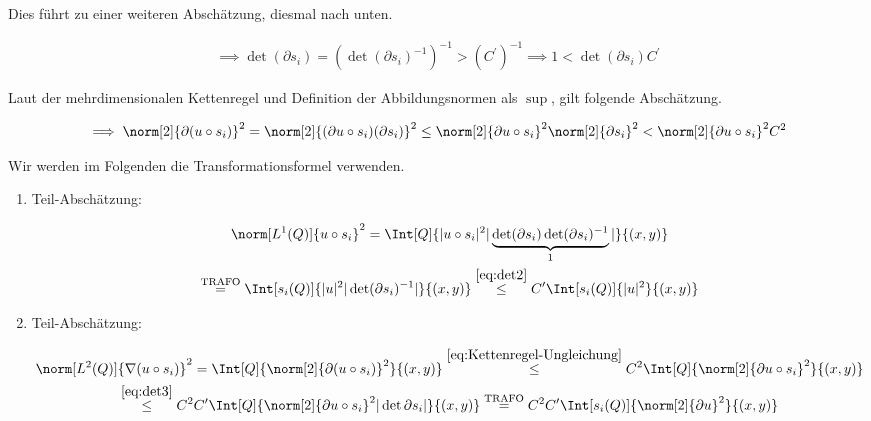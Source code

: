 \begin{solution}
\begin{enumerate}[label = \textbf{\alph*)}]
\begin{enumerate}[label = \arabic*.]
    Dies führt zu einer weiteren Abschätzung, diesmal nach unten.

    \begin{align}
      \label{eq:det3}
      \implies
      \det (\partial s_i)
      =
      (\det (\partial s_i)^{-1})^{-1}
      >
      (C^\prime)^{-1}
      \implies
      1
      <
      \det (\partial s_i)
      C^\prime
    \end{align}

    Laut der mehrdimensionalen Kettenregel und Definition der Abbildungsnormen als $\sup$, gilt folgende Abschätzung.

    \begin{align}
      \label{eq:Kettenregel-Ungleichung}
      \implies
      \norm[2]{\partial (u \circ s_i)}^2
      =
      \norm[2]{(\partial u \circ s_i)(\partial s_i)}^2
      \leq
      \norm[2]{\partial u \circ s_i}^2
      \norm[2]{\partial s_i}^2
      <
      \norm[2]{\partial u \circ s_i}^2
      C^2
    \end{align}

    Wir werden im Folgenden die Transformationsformel verwenden.


    \begin{enumerate}[label = \arabic*.]

      \item Teil-Abschätzung:

      \begin{multline}
        \label{eq:part1}
        \norm[L^1(Q)]{u \circ s_i}^2
        =
        \Int[Q]
        {
          |u \circ s_i|^2
          |
            \underbrace
            {
              \det (\partial s_i)
              \det (\partial s_i)^{-1}
            }_1
          |
        }{(x, y)} \\
        \stackrel
        {
          \text{TRAFO}
        }{=}
        \Int[s_i(Q)]
        {
          |u|^2
          |\det (\partial s_i)^{-1}|
        }{(x, y)}
        \stackrel{\eqref{eq:det2}}{\leq}
        C^\prime
        \Int[s_i(Q)]{|u|^2}{(x, y)}
      \end{multline}

      \item Teil-Abschätzung:

      \begin{multline}
        \label{eq:part2}
        \norm[L^2(Q)]{\nabla (u \circ s_i)}^2
        =
        \Int[Q]{\norm[2]{\partial (u \circ s_i)}^2}{(x, y)}
        \stackrel{\eqref{eq:Kettenregel-Ungleichung}}{\leq}
        C^2 \Int[Q]{\norm[2]{\partial u \circ s_i}^2}{(x, y)} \\
        \stackrel{\eqref{eq:det3}}{\leq}
        C^2 C^\prime \Int[Q]{\norm[2]{\partial u \circ s_i}^2 |\det \partial s_i|}{(x, y)}
        \stackrel
        {
          \text{TRAFO}
        }{=}
        C^2 C^\prime \Int[s_i(Q)]{\norm[2]{\partial u}^2}{(x, y)}
      \end{multline}


\end{enumerate}
\end{enumerate}
\end{enumerate}
\end{solution}

